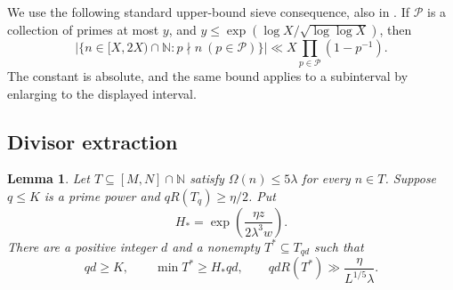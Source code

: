 \documentclass[11pt,leqno]{amsart}
\numberwithin{equation}{section}
\newtheorem{lemma}[theorem]{Lemma}
\theoremstyle{definition}
\theoremstyle{remark}
\newcommand{\N}{\mathbb N}
\newcommand{\card}[1]{\lvert #1\rvert}
\begin{document}
We use the following standard upper-bound sieve consequence, also in
\cite[Lemma~2.4]{LS}. If $\mathcal P$ is a collection of primes at most
$y$, and
$y\le\exp(\log X/\sqrt{\log\log X})$, then
\begin{equation}\label{eq:sieve}
 \card{\{n\in[X,2X)\cap\N:p\nmid n\ (p\in\mathcal P)\}}
 \ll X\prod_{p\in\mathcal P}(1-p^{-1}).
\end{equation}
The constant is absolute, and the same bound applies to a subinterval
by enlarging to the displayed interval.

\subsection{Divisor extraction}

\begin{lemma}\label{lem:divisorextraction}
Let $T\subseteq[M,N]\cap\N$ satisfy $\Omega(n)\le5\lambda$ for every
$n\in T$. Suppose $q\le K$ is a prime power and $qR(T_q)\ge\eta/2$.
Put
\[
 H_* =\exp\left(\frac{\eta z}{2\lambda^3w}\right).
\]
There are a positive integer $d$ and a nonempty $T^*\subseteq T_{qd}$
such that
\begin{equation}\label{eq:extraction}
 qd\ge K,\qquad \min T^*\ge H_*qd,\qquad
 qdR(T^*)\gg\frac\eta{L^{1/5}\lambda}.
\end{equation}
\end{lemma}
\end{document}
